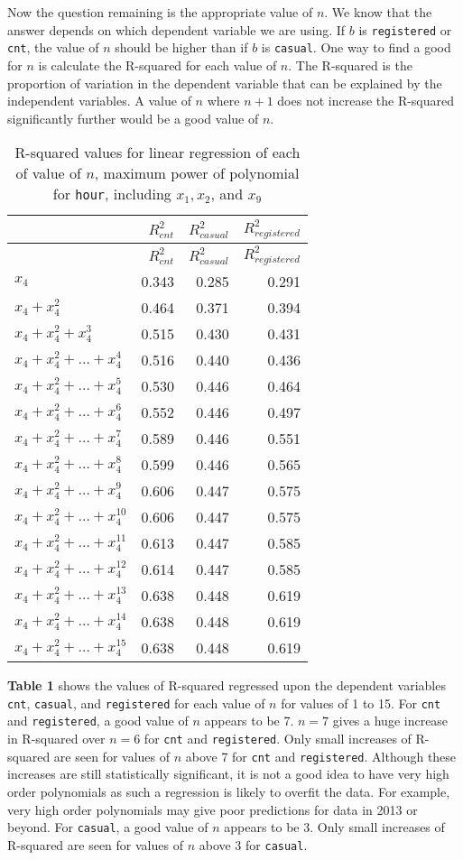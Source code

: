 \documentclass[
]{article}
\begin{document}
Now the question remaining is the appropriate value of \(n\). We know that the answer depends on which dependent variable we are using. If \(b\) is \texttt{registered} or \texttt{cnt}, the value of \(n\) should be higher than if \(b\) is \texttt{casual}. One way to find a good for \(n\) is calculate the R-squared for each value of \(n\). The R-squared is the proportion of variation in the dependent variable that can be explained by the independent variables. A value of \(n\) where \(n+1\) does not increase the R-squared significantly further would be a good value of \(n\).

\begin{longtable}[]{@{}lrrr@{}}
\caption{R-squared values for linear regression of each of value of \(n\), maximum power of polynomial for \texttt{hour}, including \(x_{1}, x_{2}\), and \(x_{9}\)}\tabularnewline
\toprule
& \(R^{2}_{cnt}\) & \(R^{2}_{casual}\) &
\(R^{2}_{registered}\)\tabularnewline
\midrule
\endfirsthead
\toprule
& \(R^{2}_{cnt}\) & \(R^{2}_{casual}\) &
\(R^{2}_{registered}\)\tabularnewline
\midrule
\endhead
\(x_{4}\) & 0.343 & 0.285 & 0.291\tabularnewline
\(x_{4}+x_{4}^{2}\) & 0.464 & 0.371 & 0.394\tabularnewline
\(x_{4}+x_{4}^{2}+x_{4}^{3}\) & 0.515 & 0.430 & 0.431\tabularnewline
\(x_{4}+x_{4}^{2}+\dots+x_{4}^{4}\) & 0.516 & 0.440 &
0.436\tabularnewline
\(x_{4}+x_{4}^{2}+\dots+x_{4}^{5}\) & 0.530 & 0.446 &
0.464\tabularnewline
\(x_{4}+x_{4}^{2}+\dots+x_{4}^{6}\) & 0.552 & 0.446 &
0.497\tabularnewline
\(x_{4}+x_{4}^{2}+\dots+x_{4}^{7}\) & 0.589 & 0.446 &
0.551\tabularnewline
\(x_{4}+x_{4}^{2}+\dots+x_{4}^{8}\) & 0.599 & 0.446 &
0.565\tabularnewline
\(x_{4}+x_{4}^{2}+\dots+x_{4}^{9}\) & 0.606 & 0.447 &
0.575\tabularnewline
\(x_{4}+x_{4}^{2}+\dots+x_{4}^{10}\) & 0.606 & 0.447 &
0.575\tabularnewline
\(x_{4}+x_{4}^{2}+\dots+x_{4}^{11}\) & 0.613 & 0.447 &
0.585\tabularnewline
\(x_{4}+x_{4}^{2}+\dots+x_{4}^{12}\) & 0.614 & 0.447 &
0.585\tabularnewline
\(x_{4}+x_{4}^{2}+\dots+x_{4}^{13}\) & 0.638 & 0.448 &
0.619\tabularnewline
\(x_{4}+x_{4}^{2}+\dots+x_{4}^{14}\) & 0.638 & 0.448 &
0.619\tabularnewline
\(x_{4}+x_{4}^{2}+\dots+x_{4}^{15}\) & 0.638 & 0.448 &
0.619\tabularnewline
\bottomrule
\end{longtable}

\textbf{Table 1} shows the values of R-squared regressed upon the
dependent variables \texttt{cnt}, \texttt{casual}, and
\texttt{registered} for each value of \(n\) for values of 1 to 15. For \texttt{cnt} and \texttt{registered}, a good value of \(n\) appears to be 7. \(n = 7\) gives a huge increase in R-squared over \(n = 6\) for \texttt{cnt} and \texttt{registered}. Only small increases of R-squared
are seen for values of \(n\) above 7 for \texttt{cnt} and
\texttt{registered}. Although these increases are still statistically significant, it is not a good idea to have very high order polynomials as such a regression is likely to overfit the data. For example, very high order polynomials may give poor predictions for data in 2013 or beyond. For \texttt{casual}, a good value of \(n\) appears to be 3. Only small increases of R-squared are seen for values of \(n\) above 3 for
\texttt{casual}.
\end{document}
